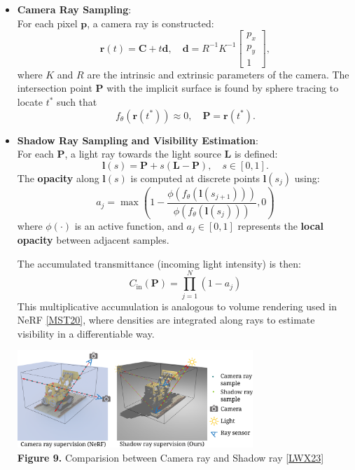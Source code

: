 \documentclass[12pt,a4paper]{article}
\theoremstyle{definition}
\begin{document}
\begin{itemize}[noitemsep, topsep=0pt]
    \item \textbf{Camera Ray Sampling}: \\
    For each pixel $\mathbf{p}$, a camera ray is constructed:
    \[
    \mathbf{r}(t) = \mathbf{C} + t \mathbf{d}, \quad \mathbf{d} = R^{-1} K^{-1} \begin{bmatrix} p_x \\ p_y \\ 1 \end{bmatrix},
    \]
    where $K$ and $R$ are the intrinsic and extrinsic parameters of the camera. The intersection point $\mathbf{P}$ with the implicit surface is found by sphere tracing to locate $t^*$ such that
    \[
    f_\theta(\mathbf{r}(t^*)) \approx 0, \quad \mathbf{P} = \mathbf{r}(t^*).
    \]

    \item \textbf{Shadow Ray Sampling and Visibility Estimation}: \\ 
    For each $\mathbf{P}$, a light ray towards the light source $\mathbf{L}$ is defined:
    \[
    \mathbf{l}(s) = \mathbf{P} + s (\mathbf{L} - \mathbf{P}), \quad s \in [0, 1].
    \]
    The \textbf{opacity} along $\mathbf{l}(s)$ is computed at discrete points $\mathbf{l}(s_j)$ using:
    \[
    a_j = \max\left( 1 - \frac{ \phi(f_\theta(\mathbf{l}(s_{j+1})) ) }{ \phi(f_\theta(\mathbf{l}(s_j))) }, 0 \right)
    \]
    where $\phi(\cdot)$ is an active function, and $a_j \in [0,1]$ represents the \textbf{local opacity} between adjacent samples.

    The accumulated transmittance (incoming light intensity) is then:
    \[
    C_{\mathrm{in}}(\mathbf{P}) = \prod_{j=1}^N (1 - a_j)
    \]
    This multiplicative accumulation is analogous to volume rendering used in NeRF \hyperlink{[MST20]}{[MST20]}, where densities are integrated along rays to estimate visibility in a differentiable way.
    \begin{center}
        \includegraphics[width=0.7\textwidth]{shadowneus_rays.png} \\
        \textbf{Figure 9.} Comparision between Camera ray and Shadow ray \hyperlink{[LWX23]}{[LWX23]}
    \end{center}

\end{itemize}
\end{document}
